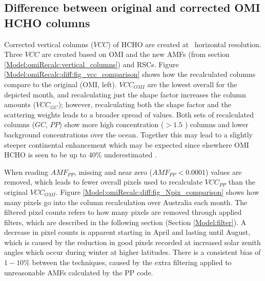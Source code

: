   \subsection{Difference between original and corrected OMI HCHO columns}
  
    
    Corrected vertical columns ($VCC$) of HCHO are created at \highhr ~horizontal resolution.
    Three $VCC$ are created based on OMI and the new AMFs (from section \ref{Model:omiRecalc:vertical_columns}) and RSCs.
    Figure \ref{Model:omiRecalc:diff:fig_vcc_comparison} shows how the recalculated columns compare to the original (OMI, left). 
    $VCC_{OMI}$ are the lowest overall for the depicted month, and recalculating just the shape factor increases the column amounts ($VCC_{GC}$); however, recalculating both the shape factor and the scattering weights leads to a broader spread of values.
    Both sets of recalculated columns ($GC$, $PP$) show more high concentration ($>1.5$ \moleccm) columns and lower background concentrations over the ocean.
    Together this may lead to a slightly steeper continental enhancement which may be expected since elsewhere OMI HCHO is seen to be up to 40\% underestimated \parencite[e.g.,][]{Zhu2016,DeSmedt2015,Barkley2013}.
    
    
    
    
    
    
    
    When reading $AMF_{PP}$, missing and near zero ($AMF_{PP}<0.0001$) values are removed, which leads to fewer overall pixels used to recalculate $VCC_{PP}$ than the original $VCC_{OMI}$. 
    Figure \ref{Model:omiRecalc:diff:fig_Npix_comparison} shows how many pixels go into the column recalculation over Australia each month.
    The filtered pixel counts refers to how many pixels are removed through applied filters, which are described in the following section (Section \ref{Model:filter}).
    A decrease in pixel counts is apparent starting in April and lasting until August, which is caused by the reduction in good pixels recorded at increased solar zenith angles which occur during winter at higher latitudes.
    There is a consistent bias of $1-10\%$ between the techniques, caused by the extra filtering applied to unreasonable AMFs calculated by the PP code.
    
